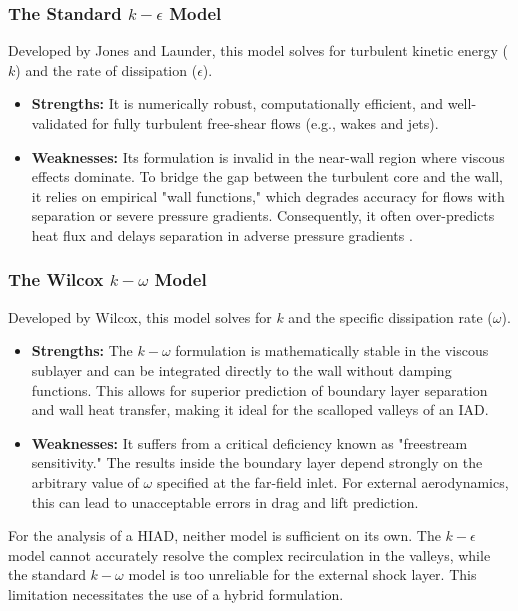 \subsubsection*{The Standard $k-\epsilon$ Model}
Developed by Jones and Launder, this model solves for turbulent kinetic energy ($k$) and the rate of dissipation ($\epsilon$).
\begin{itemize}
    \item \textbf{Strengths:} It is numerically robust, computationally efficient, and well-validated for fully turbulent free-shear flows (e.g., wakes and jets).
    \item \textbf{Weaknesses:} Its formulation is invalid in the near-wall region where viscous effects dominate. To bridge the gap between the turbulent core and the wall, it relies on empirical "wall functions," which degrades accuracy for flows with separation or severe pressure gradients. Consequently, it often over-predicts heat flux and delays separation in adverse pressure gradients \cite{versteeg2007cfd}.
\end{itemize}

\subsubsection*{The Wilcox $k-\omega$ Model}
Developed by Wilcox, this model solves for $k$ and the specific dissipation rate ($\omega$).
\begin{itemize}
    \item \textbf{Strengths:} The $k-\omega$ formulation is mathematically stable in the viscous sublayer and can be integrated directly to the wall without damping functions. This allows for superior prediction of boundary layer separation and wall heat transfer, making it ideal for the scalloped valleys of an IAD.
    \item \textbf{Weaknesses:} It suffers from a critical deficiency known as "freestream sensitivity." The results inside the boundary layer depend strongly on the arbitrary value of $\omega$ specified at the far-field inlet. For external aerodynamics, this can lead to unacceptable errors in drag and lift prediction.
\end{itemize}

For the analysis of a HIAD, neither model is sufficient on its own. The $k-\epsilon$ model cannot accurately resolve the complex recirculation in the valleys, while the standard $k-\omega$ model is too unreliable for the external shock layer. This limitation necessitates the use of a hybrid formulation. ~\cite{articlessk}

